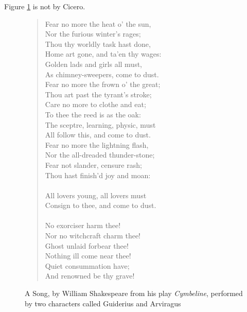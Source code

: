 \documentclass{elsart}
\begin{document}
Figure \ref{song} is not by Cicero.
\begin{figure}
\begin{quote}
\selectfont
Fear no more the heat o' the sun,\\
Nor the furious winter's rages;\\
Thou thy worldly task hast done,\\
Home art gone, and ta'en thy wages:\\
Golden lads and girls all must,\\
As chimney-sweepers, come to dust.\\
Fear no more the frown o' the great;\\
Thou art past the tyrant's stroke;\\
Care no more to clothe and eat;\\
To thee the reed is as the oak:\\
The sceptre, learning, physic, must\\
All follow this, and come to dust.\\
Fear no more the lightning flash,\\
Nor the all-dreaded thunder-stone;\\
Fear not slander, censure rash;\\
Thou hast finish'd joy and moan:\\
\\
 All lovers young, all lovers must\\
 Consign to thee, and come to dust.\\
\\
No exorciser harm thee!\\
Nor no witchcraft charm thee!\\
Ghost unlaid forbear thee!\\
Nothing ill come near thee!\\
 Quiet consummation have;\\
 And renowned be thy grave!\\
\end{quote}
\caption{A Song, by William Shakespeare from his play
  \emph{Cymbeline}, performed by two characters called
Guiderius and  Arviragus}
\label{song}
\end{figure}
\end{document}
